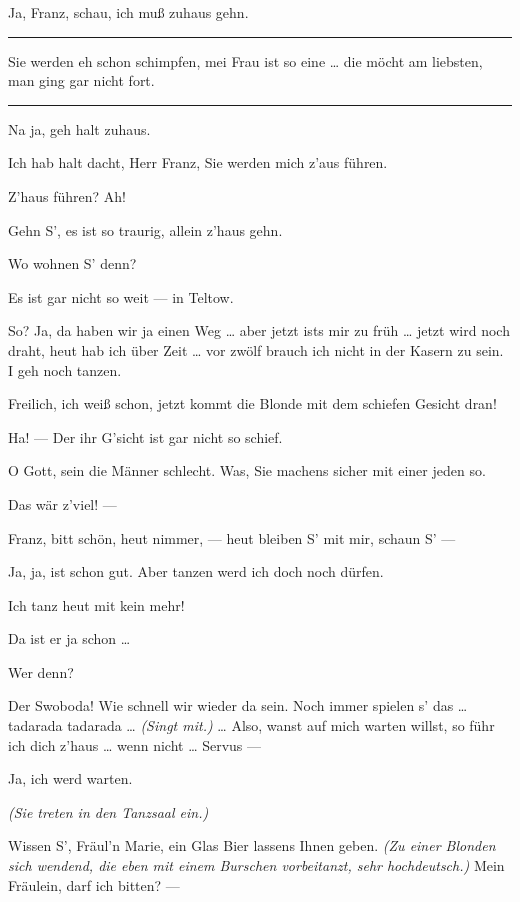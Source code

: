 \documentclass[
	final,
	a4paper,
	ngerman,
	mpinclude = true, %
	twoside = true,
	open = right,
	cleardoublepage = plain,
	DIV = 13,
	BCOR = 1cm,
	titlepage = firstiscover,
	]{scrbook}
\newcommand{\direction}[1]{\textit{(#1)}}
\newenvironment{deletion}{%
		\vspace{0.25\baselineskip}
		\hrule
		\vspace{0.25\baselineskip}
		\color{darkgray}
	}{
		\color{black}
		\vspace{0.25\baselineskip}
		\hrule 
		\vspace{0.25\baselineskip}
	}
\newcommand{\thecharacter}[1]{\textup{\textsc{#1}}\xspace}
\newcommand{\thesoldat}{\thecharacter{Soldatin}}
\newcommand{\thepraktikant}{\thecharacter{Praktikant}}
\newcommand{\character}[1]{\item[#1:]}
\newcommand{\soldat}{\character{\thesoldat}}
\newcommand{\praktikant}{\character{\thepraktikant}}
\begin{document}
\begin{play}
	\praktikant
	Ja, Franz, schau, ich muß zuhaus gehn.
	\begin{deletion}
		Sie werden eh schon schimpfen, mei Frau ist so eine \ldots{} die möcht am liebsten, man ging gar nicht fort.
	\end{deletion}

	\soldat
	Na ja, geh halt zuhaus.

	\praktikant
	Ich hab halt dacht, Herr Franz, Sie werden mich z'aus führen.

	\soldat
	Z'haus führen? Ah!

	\praktikant
	Gehn S', es ist so traurig, allein z'haus gehn.

	\soldat
	Wo wohnen S' denn?

	\praktikant
	Es ist gar nicht so weit --- in Teltow.

	\soldat
	So? Ja, da haben wir ja einen Weg \ldots{} aber jetzt ists mir zu früh \ldots{} jetzt wird noch draht, heut hab ich über Zeit \ldots{} vor zwölf brauch ich nicht in der Kasern zu sein. I geh noch tanzen.

	\praktikant
	Freilich, ich weiß schon, jetzt kommt die Blonde mit dem schiefen Gesicht dran!

	\soldat
	Ha! --- Der ihr G'sicht ist gar nicht so schief.

	\praktikant
	O Gott, sein die Männer schlecht. Was, Sie machens sicher mit einer jeden so.

	\soldat
	Das wär z'viel! ---

	\praktikant
	Franz, bitt schön, heut nimmer, --- heut bleiben S' mit mir, schaun S' ---

	\soldat
	Ja, ja, ist schon gut. Aber tanzen werd ich doch noch dürfen.

	\praktikant
	Ich tanz heut mit kein mehr!

	\soldat
	Da ist er ja schon \ldots{}

	\praktikant
	Wer denn?

	\soldat
	Der Swoboda! Wie schnell wir wieder da sein. Noch immer spielen s' das \ldots{} tadarada tadarada \ldots{} \direction{Singt mit.} \ldots{} Also, wanst auf mich warten willst, so führ ich dich z'haus \ldots{} wenn nicht \ldots{} Servus ---

	\praktikant
	Ja, ich werd warten.

	\direction{Sie treten in den Tanzsaal ein.}

	\soldat
	Wissen S', Fräul'n Marie, ein Glas Bier lassens Ihnen geben. \direction{Zu einer Blonden sich wendend, die eben mit einem Burschen vorbeitanzt, sehr hochdeutsch.} Mein Fräulein, darf ich bitten? ---

\end{play}
\end{document}
